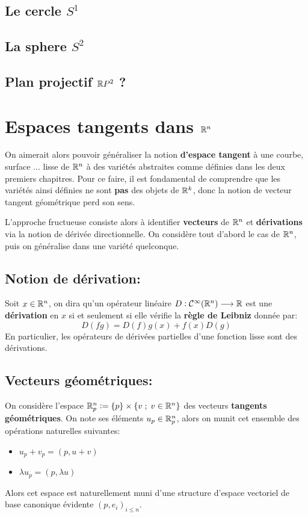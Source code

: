    \section{Le cercle \( S^1 \)}
   \section{La sphere \( S^2 \)}
   \section{Plan projectif \( \mathbb{R} P^2 \) ?}
\chapter{Espaces tangents dans \( \mathbb{R}^n \)}
On aimerait alors pouvoir généraliser la notion \textbf{d'espace tangent} à une courbe, surface ... lisse de \( \mathbb{R}^n \) à des variétés abstraites comme définies dans les deux premiers chapitres. Pour ce faire, il est fondamental de comprendre que les variétés ainsi définies ne sont \textbf{pas} des objets de \( \mathbb{R}^k \), donc la notion de vecteur tangent géométrique perd son sens.\<

L'approche fructueuse consiste alors à identifier \textbf{vecteurs} de \( \mathbb{R}^n \) et \textbf{dérivations} via la notion de dérivée directionnelle. On considère tout d'abord le cas de \( \mathbb{R}^n \), puis on généralise dans une variété quelconque.

\section{Notion de dérivation:}
Soit \(x \in \mathbb{R}^n\), on dira qu'un opérateur linéaire \( D: \mathcal{C}^\infty(\mathbb{R}^n) \longrightarrow \mathbb{R} \) est une \textbf{dérivation} en \( x \) si et seulement si elle vérifie la \textbf{règle de Leibniz} donnée par:
\[ 
   D(fg) = D(f)g(x) + f(x)D(g) 
\]
En particulier, les opérateurs de dérivées partielles d'une fonction lisse sont des dérivations.
\section{Vecteurs géométriques:}
On considère l'espace \(\mathbb{R}^n_p := \left\{ p \right\} \times \left\{ v \; ; \; v \in \mathbb{R}^n \right\}\) des vecteurs \textbf{tangents géométriques}. On note ses éléments \( u_p \in \mathbb{R}^n_p\), alors on munit cet ensemble des opérations naturelles suivantes:
\begin{itemize}
   \item \(u_p + v_p = (p, u + v)\)
   \item \(\lambda u_p = (p, \lambda u)\)
\end{itemize}
Alors cet espace est naturellement muni d'une structure d'espace vectoriel de base canonique évidente \( (p, e_i)_{i \leq n} \).
